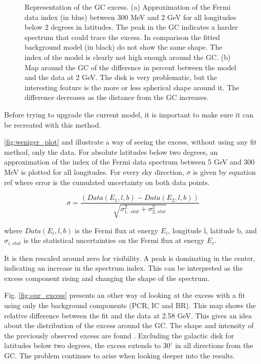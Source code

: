 \begin{figure}[h]
\begin{minipage}[h]{0.45\textwidth}
	  \subcaption{}
	  \label{fig:our_excess}
  \end{minipage}
  \caption{Representation of the GC excess. (a) Approximation of the Fermi data index (in blue) between 300 MeV and 2 GeV for all longitudes below 2 degrees in latitudes. The peak in the GC indicates a harder spectrum that could trace the excess. In comparison the fitted background model (in black) do not show the same shape. The index of the model is clearly not high enough around the GC. (b) Map around the GC of the difference  in percent between the model and the data at 2 GeV. The disk is very problematic, but the interesting feature is the more or less spherical shape around it. The difference decreases as the distance from the GC increases.}
  \label{fig:GC_excess}	 
\end{figure}

Before trying to upgrade the current model, it is important to make sure it can be recreated with this method. 

\ref{fig:weniger_plot} and  illustrate a way of seeing the excess, without using any fit method, only the data. For absolute latitudes below two degrees, an approximation of the index of the Fermi data spectrum between 5 GeV and 300 MeV is plotted for all longitudes. For every sky direction, $\sigma$ is given by equation ref where error is the cumulated uncertainty on both data points.

\begin{equation}
\sigma = \frac{\left(Data(E_1, l, b) - Data(E_2, l, b) \right)}{\sqrt{\sigma_{1,\ stat}^2 + \sigma_{2, stat}^2}}
\end{equation}

where $Data(E_i,l,b)$ is the Fermi flux at energy $E_i$, longitude l, latitude b, and $\sigma_{i, stat}$ is the statistical uncertainties on the Fermi flux at energy $E_i$.

It is then rescaled around zero for visibility. A peak is dominating in the center, indicating an increase in the spectrum index. This can be interpreted as the excess component rising and changing the shape of the spectrum.

Fig. \ref{fig:our_excess} presents an other way of looking at the excess with a fit using only the background components (PCR, IC and BR). This map shows the relative difference between the fit and the data at 2.58 GeV. This gives an idea about the distribution of the excess around the GC. The shape and intensity of the previously observed excess are found \cite{Hooper2011}. Excluding the galactic disk for latitudes below two degrees, the excess extends to $30^\circ$ in all directions from the GC. The problem continues to arise when looking deeper into the results.


